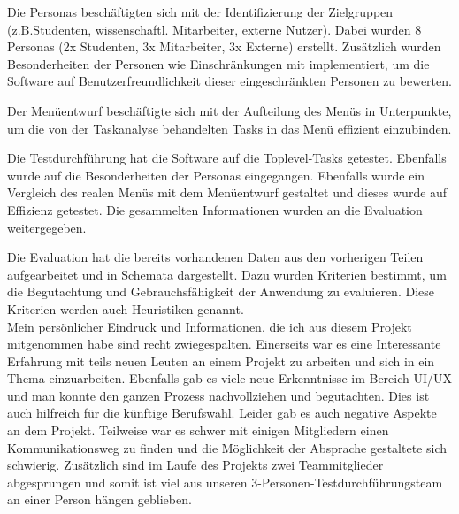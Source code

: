 \documentclass{TUBAFarbeiten}
\begin{document}
Die Personas beschäftigten sich mit der Identifizierung der Zielgruppen (z.B.Studenten, wissenschaftl. Mitarbeiter, externe Nutzer). Dabei wurden 8 Personas (2x Studenten, 3x Mitarbeiter, 3x Externe) erstellt. Zusätzlich wurden Besonderheiten der Personen wie Einschränkungen mit implementiert, um die Software auf Benutzerfreundlichkeit dieser eingeschränkten Personen zu bewerten.

Der Menüentwurf beschäftigte sich mit der Aufteilung des Menüs in Unterpunkte, um die von der Taskanalyse behandelten Tasks in das Menü effizient einzubinden. 

Die Testdurchführung hat die Software auf die Toplevel-Tasks getestet. Ebenfalls wurde auf die Besonderheiten der Personas eingegangen. Ebenfalls wurde ein Vergleich des realen Menüs mit dem Menüentwurf gestaltet und dieses wurde auf Effizienz getestet. Die gesammelten Informationen wurden an die Evaluation weitergegeben.

Die Evaluation hat die bereits vorhandenen Daten aus den vorherigen Teilen aufgearbeitet und in Schemata dargestellt. Dazu wurden Kriterien bestimmt, um die Begutachtung und Gebrauchsfähigkeit der Anwendung zu evaluieren. Diese Kriterien werden auch Heuristiken genannt.\\

Mein persönlicher Eindruck und Informationen, die ich aus diesem Projekt mitgenommen habe sind recht zwiegespalten. Einerseits war es eine Interessante Erfahrung mit teils neuen Leuten an einem Projekt zu arbeiten und sich in ein Thema einzuarbeiten. Ebenfalls gab es viele neue Erkenntnisse im Bereich UI/UX und man konnte den ganzen Prozess nachvollziehen und begutachten. Dies ist auch hilfreich für die künftige Berufswahl. Leider gab es auch negative Aspekte an dem Projekt. Teilweise war es schwer mit einigen Mitgliedern einen Kommunikationsweg zu finden und die Möglichkeit der Absprache gestaltete sich schwierig. Zusätzlich sind im Laufe des Projekts zwei Teammitglieder abgesprungen und somit ist viel aus unseren 3-Personen-Testdurchführungsteam an einer Person hängen geblieben.\\
\end{document}
